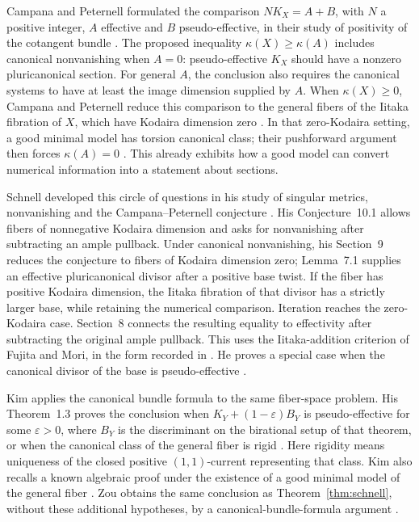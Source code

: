 Campana and Peternell formulated the comparison
$NK_X=A+B$, with $N$ a positive integer, $A$ effective and $B$
pseudo-effective, in their
study of positivity of the cotangent bundle
\cite[Conjecture~2.4]{CP2011}. The proposed inequality
$\kappa(X)\geq\kappa(A)$ includes canonical nonvanishing when
$A=0$: pseudo-effective $K_X$ should have a nonzero pluricanonical
section. For general $A$, the conclusion also requires the canonical
systems to have at least the image dimension supplied by $A$.
When $\kappa(X)\geq0$, Campana and Peternell reduce this comparison
to the general fibers of the Iitaka fibration of $X$, which have
Kodaira dimension zero \cite[Proposition~2.6]{CP2011}. In that
zero-Kodaira setting, a good minimal model has torsion canonical
class; their pushforward argument then forces $\kappa(A)=0$
\cite[Proposition~2.7]{CP2011}. This already exhibits how a good
model can convert numerical information into a statement about
sections.

Schnell developed this circle of questions in his study of singular
metrics, nonvanishing and the Campana--Peternell conjecture
\cite[Sections~4--10]{Schnell2022}. His Conjecture~10.1 allows fibers
of nonnegative Kodaira dimension and asks for nonvanishing after
subtracting an ample pullback. Under canonical nonvanishing, his
Section~9 reduces the conjecture to fibers of Kodaira dimension zero;
Lemma~7.1 supplies an effective pluricanonical divisor after a positive
base twist. If the fiber has positive Kodaira dimension, the Iitaka
fibration of that divisor has a strictly larger base, while retaining
the numerical comparison. Iteration reaches the zero-Kodaira case.
Section~8 connects the resulting equality to effectivity after
subtracting the original ample pullback. This uses the Iitaka-addition
criterion of Fujita and Mori, in the form recorded in
\cite[Lemma~4.6]{PopaSchnell2014}. He proves a special case when the
canonical divisor of the base is pseudo-effective
\cite[Theorem~12.1]{Schnell2022}.

Kim applies the canonical bundle formula to the same fiber-space
problem. His Theorem~1.3 proves the conclusion when
$K_Y+(1-\varepsilon)B_Y$ is pseudo-effective for some
$\varepsilon>0$, where $B_Y$ is the discriminant on the birational
setup of that theorem, or when the canonical class of the general
fiber is rigid \cite{Kim2025}. Here rigidity means uniqueness of
the closed positive $(1,1)$-current representing that class.
Kim also recalls a known algebraic proof under the existence of a
good minimal model of the general fiber
\cite[Section~1.3]{Kim2025}. Zou obtains the same
conclusion as Theorem~\ref{thm:schnell}, without these additional
hypotheses, by a canonical-bundle-formula argument
\cite[Theorems~1.3 and~5.1]{Zou2025}.

